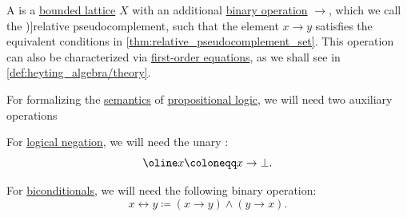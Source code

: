 \begin{definition}\label{def:heyting_algebra}
  A  is a \hyperref[def:bounded_lattice]{bounded lattice} \( X \) with an additional \hyperref[def:binary_operation]{binary operation} \( {\rightarrow} \), which we call the \term[en=relative pseudocomplement (\cite[51]{Birkhoff1967LatticeTheory})]{relative pseudocomplement}, such that the element \( x \rightarrow y \) satisfies the equivalent conditions in \cref{thm:relative_pseudocomplement_set}. This operation can also be characterized via \hyperref[def:fol_equation]{first-order equations}, as we shall see in \cref{def:heyting_algebra/theory}.

  For formalizing the \hyperref[def:propositional_semantics]{semantics} of \hyperref[def:propositional_logic]{propositional logic}, we will need two auxiliary operations
  \begin{thmenum}[series=def:heyting_algebra]
     For \hyperref[def:propositional_alphabet/negation]{logical negation}, we will need the unary :
    \begin{equation}\label{eq:def:heyting_algebra/pseudocomplement}
      \oline x \coloneqq x \rightarrow \bot.
    \end{equation}

     For \hyperref[def:propositional_alphabet/connectives/biconditional]{biconditionals}, we will need the following binary operation:
    \begin{equation}\label{eq:def:heyting_algebra/biconditional}
      x \leftrightarrow y \coloneqq (x \rightarrow y) \wedge (y \rightarrow x).
    \end{equation}
  \end{thmenum}


\end{definition}
